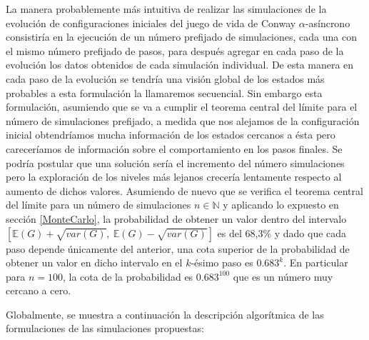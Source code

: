 \documentclass[../proyecto.tex]{memoir}
\begin{document}
La manera probablemente más intuitiva de realizar las simulaciones de la evolución de configuraciones iniciales del juego de vida de Conway $\alpha$-asíncrono consistiría en la ejecución de un número prefijado de simulaciones, cada una con el mismo número prefijado de pasos, para después agregar en cada paso de la evolución los datos obtenidos de cada simulación individual. De esta manera en cada paso de la evolución se tendría una visión global de los estados más probables a esta formulación la llamaremos secuencial. Sin embargo esta formulación, asumiendo que se va a cumplir el teorema central del límite para el número de simulaciones prefijado, a medida que nos alejamos de la configuración inicial obtendríamos mucha información de los estados cercanos a ésta pero careceríamos de información sobre el comportamiento en los pasos finales. Se podría postular que una solución sería el incremento del número simulaciones pero la exploración de los niveles más lejanos crecería lentamente respecto al aumento de dichos valores. Asumiendo de nuevo que se verifica el teorema central del límite para un número de simulaciones $n\in\mathds{N}$ y aplicando lo expuesto en sección \ref{MonteCarlo}, la probabilidad de obtener un valor dentro del intervalo $[\mathds{E}(G)+\sqrt{var(G)},\ \mathds{E}(G)-\sqrt{var(G)}]$ es del 68,3\% y dado que cada paso depende únicamente del anterior, una cota superior de la probabilidad de obtener un valor en dicho intervalo en el $k$-ésimo paso es $0.683^k$. En particular para $n=100$, la cota de la probabilidad es $0.683^{100}$ que es un número muy cercano a cero.

Globalmente, se muestra a continuación la descripción algorítmica de las formulaciones de las simulaciones propuestas:




\end{document}
